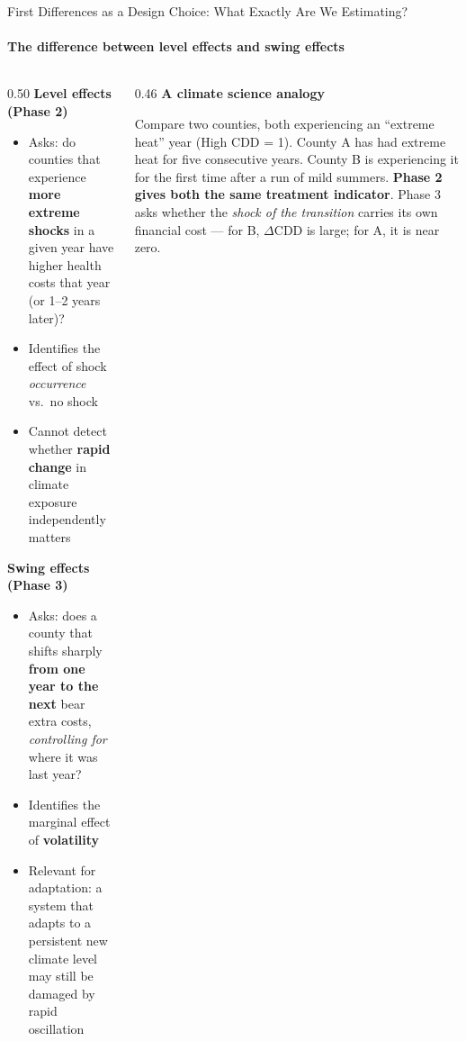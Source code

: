\documentclass[aspectratio=169,11pt]{beamer}
\newcommand{\emphcolor}[1]{{\color{WarmOrange}\textbf{#1}}}
\newcommand{\tealtext}[1]{{\color{Teal}#1}}
\begin{document}
\begin{frame}[shrink=18]{First Differences as a Design Choice: What Exactly Are We Estimating?}
  \framesubtitle{The difference between level effects and swing effects}
  \begin{columns}[T]
    \begin{column}{0.50\textwidth}
      \textbf{\tealtext{Level effects (Phase 2)}}\\[0.2em]
      \footnotesize
      \begin{itemize}\itemsep0.14em
        \item Asks: do counties that experience \emphcolor{more extreme shocks} in a given year have higher health costs that year (or 1--2 years later)?
        \item Identifies the effect of shock \emph{occurrence} vs.\ no shock
        \item Cannot detect whether \emphcolor{rapid change} in climate exposure independently matters
      \end{itemize}
      \vspace{0.3em}
      \textbf{\tealtext{Swing effects (Phase 3)}}\\[0.2em]
      \begin{itemize}\itemsep0.14em
        \item Asks: does a county that shifts sharply \emphcolor{from one year to the next} bear extra costs, \emph{controlling for} where it was last year?
        \item Identifies the marginal effect of \emphcolor{volatility}
        \item Relevant for adaptation: a system that adapts to a persistent new climate level may still be damaged by rapid oscillation
      \end{itemize}
    \end{column}
    \begin{column}{0.46\textwidth}
      \textbf{\tealtext{A climate science analogy}}\\[0.2em]
      \footnotesize
      \begin{block}{}
        \scriptsize
        Compare two counties, both experiencing an ``extreme heat'' year (High CDD = 1). County A has had extreme heat for five consecutive years. County B is experiencing it for the first time after a run of mild summers. \emphcolor{Phase 2 gives both the same treatment indicator}. Phase 3 asks whether the \emph{shock of the transition} carries its own financial cost --- for B, $\Delta$CDD is large; for A, it is near zero.

\end{block}
\end{column}
\end{columns}
\end{frame}
\end{document}

